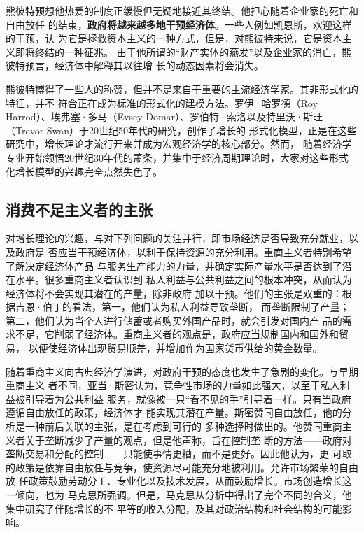熊彼特预想他热爱的制度正缓慢但无疑地接近其终结。他担心随着企业家的死亡和自由放任
的结束，\textbf{政府将越来越多地干预经济体}。一些人例如凯恩斯，欢迎这样的干预，认
为它是拯救资本主义的一种方式，但是，对熊彼特来说，它是资本主义即将终结的一种征兆。
由于他所谓的“财产实体的燕发”以及企业家的消亡，熊彼特预言，经济体中解释其以往增
长的动态因素将会消失。

熊彼特博得了一些人的称赞，但并不是来自于重要的主流经济学家。其非形式化的特征，并不
符合正在成为标准的形式化的建模方法。罗伊·哈罗德（Roy Harrod）、埃弗塞·多马（Evsey
Domar）、罗伯特·索洛以及特里沃·斯旺（Trevor Swan）于20世纪50年代的研究，创作了增长的
形式化模型，正是在这些研究中，增长理论才流行开来并成为宏观经济学的核心部分。然而，
随着经济学专业开始领悟20世纪30年代的萧条，并集中于经济周期理论时，大家对这些形式
化增长模型的兴趣完全点然失色了。

\subsection{消费不足主义者的主张}

对增长理论的兴趣，与对下列问题的关注并行，即市场经济是否导致充分就业，以及政府是
否应当干预经济体，以利于保持资源的充分利用。重商主义者特别希望了解决定经济体产品
与服务生产能力的力量，并确定实际产量水平是否达到了潜在水平。很多重商主义者认识到
私人利益与公共利益之间的根本冲突，从而认为经济体将不会实现其潜在的产量，除非政府
加以干预。他们的主张是双重的：根据吉恩·伯丁的看法，第一，他们认为私人利益导致垄断，
而垄断限制了产量；第二，他们认为当个人进行储蓄或者购买外国产品时，就会引发对国内产
品的需求不足，它削弱了经济体。重商主义者的观点是，政府应当规制国内和国外和贸易，
以便使经济体出现贸易顺差，并增加作为国家货币供给的黄金数量。

随着重商主义向古典经济学演进，对政府干预的态度也发生了急剧的变化。与早期重商主义
者不同，亚当·斯密认为，竞争性市场的力量如此强大，以至于私人利益被引导着为公共利益
服务，就像被一只“看不见的手”引导着一样。只有当政府遵循自由放任的政策，经济体才
能实现其潜在产量。斯密赞同自由放任，他的分析是一种前后关联的主张，是在考虑到可行的
多种选择时做出的。他赞同重商主义者关于垄断减少了产量的观点，但是他声称，旨在控制垄
断的方法——政府对垄断交易和分配的控制——只能使事情更糟，而不是更好。因此他认为，更
可取的政策是依靠自由放任与竞争，使资源尽可能充分地被利用。允许市场繁荣的自由放
任政策鼓励劳动分工、专业化以及技术发展，从而鼓励增长。市场创造增长这一倾向，也为
马克思所强调。但是，马克思从分析中得出了完全不同的合义，他集中研究了伴随增长的不
平等的收入分配，及其对政治结构和社会结构的可能影响。

